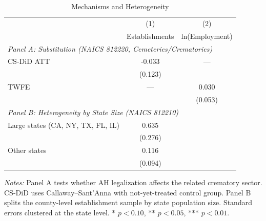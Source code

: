 \begin{table}[H]
\centering
\caption{Mechanisms and Heterogeneity}
\begin{threeparttable}
\begin{tabular}{lcc}
\toprule
 & (1) & (2) \\
 & Establishments & ln(Employment) \\
\midrule
\multicolumn{3}{l}{\textit{Panel A: Substitution (NAICS 812220, Cemeteries/Crematories)}} \\
CS-DiD ATT & -0.033 & --- \\
           & (0.123) & \\
TWFE & --- & 0.030 \\
     &     & (0.053) \\
\midrule
\multicolumn{3}{l}{\textit{Panel B: Heterogeneity by State Size (NAICS 812210)}} \\
Large states (CA, NY, TX, FL, IL) & 0.635 & \\
                                  & (0.276) & \\
Other states & 0.116 & \\
             & (0.094) & \\
\bottomrule
\end{tabular}
\begin{tablenotes}[flushleft]
\small
\item \textit{Notes:} Panel A tests whether AH legalization affects the related crematory sector. CS-DiD uses Callaway--Sant'Anna with not-yet-treated control group. Panel B splits the county-level establishment sample by state population size. Standard errors clustered at the state level. * $p<0.10$, ** $p<0.05$, *** $p<0.01$.
\end{tablenotes}
\end{threeparttable}
\label{tab:mechanisms}
\end{table}

